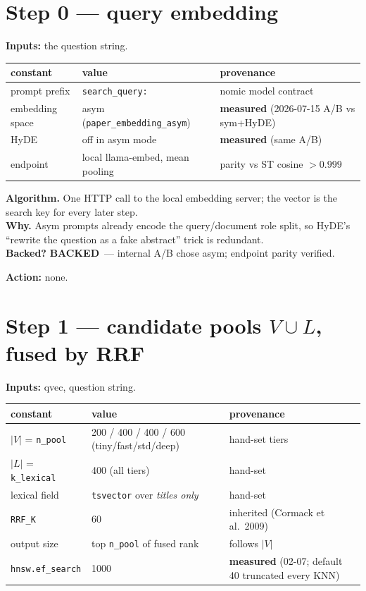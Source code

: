 \documentclass[10pt]{article}
\newenvironment{varbox}
  {\par\medskip\begin{lrbox}{\varboxsave}%
   \begin{minipage}{\dimexpr\linewidth-2\fboxsep\relax}\small\vspace{4pt}}
  {\vspace{4pt}\end{minipage}\end{lrbox}%
   \noindent\colorbox{boxbg}{\usebox{\varboxsave}}\par\medskip}
\newcommand{\backedyes}{\textcolor{green!50!black}{\textbf{BACKED}}}
\newcommand{\act}[1]{\par\smallskip\noindent\textbf{Action:} #1}
\begin{document}
\section{Step 0 --- query embedding}
\textbf{Inputs:} the question string.

\begin{varbox}
\begin{tabular}{@{}lll@{}}
\toprule
constant & value & provenance \\
\midrule
prompt prefix & \texttt{search\_query:} & nomic model contract \\
embedding space & asym (\texttt{paper\_embedding\_asym}) & \textbf{measured} (2026-07-15 A/B vs sym+HyDE) \\
HyDE & off in asym mode & \textbf{measured} (same A/B) \\
endpoint & local llama-embed, mean pooling & parity vs ST cosine $>0.999$ \\
\bottomrule
\end{tabular}
\end{varbox}

\textbf{Algorithm.} One HTTP call to the local embedding server; the vector is the search
key for every later step. \\
\textbf{Why.} Asym prompts already encode the query/document role split, so HyDE's
``rewrite the question as a fake abstract'' trick is redundant. \\
\textbf{Backed?} \backedyes\ --- internal A/B chose asym; endpoint parity verified. \\
\act{none.}

\section{Step 1 --- candidate pools $V \cup L$, fused by RRF}
\textbf{Inputs:} qvec, question string.

\begin{varbox}
\begin{tabular}{@{}lll@{}}
\toprule
constant & value & provenance \\
\midrule
$|V|$ = \texttt{n\_pool} & 200 / 400 / 400 / 600 (tiny/fast/std/deep) & hand-set tiers \\
$|L|$ = \texttt{k\_lexical} & 400 (all tiers) & hand-set \\
lexical field & \texttt{tsvector} over \emph{titles only} & hand-set \\
\texttt{RRF\_K} & 60 & inherited (Cormack et al.\ 2009) \\
output size & top \texttt{n\_pool} of fused rank & follows $|V|$ \\
\texttt{hnsw.ef\_search} & 1000 & \textbf{measured} (02-07; default 40 truncated every KNN) \\
\bottomrule
\end{tabular}
\end{varbox}
\end{document}
